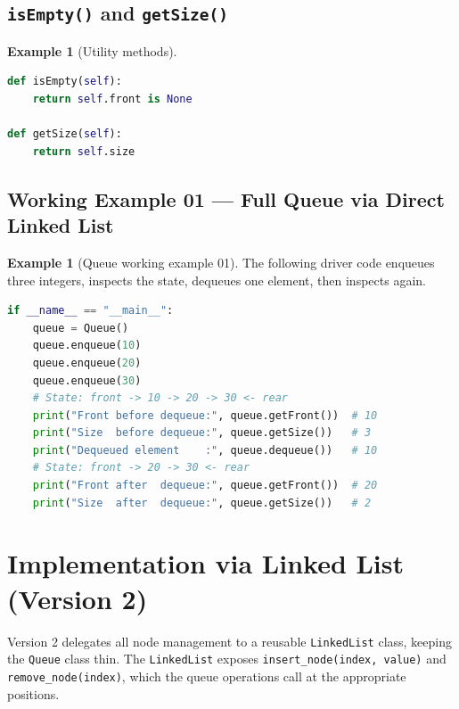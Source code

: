 \documentclass[11pt, a4paper, notitlepage]{report}
\theoremstyle{definition}
\theoremstyle{remark}
\theoremstyle{definition}
\newtheorem{example}[theorem]{Example}
\begin{document}
\subsection{\texttt{isEmpty()} and \texttt{getSize()}}
\label{subsec:queue-utils}

\begin{example}[Utility methods]
\label{ex:queue-utils}
\leavevmode
\begin{lstlisting}[language=Python]
def isEmpty(self):
    return self.front is None

def getSize(self):
    return self.size
\end{lstlisting}
\end{example}

\subsection{Working Example 01 --- Full Queue via Direct Linked List}
\label{subsec:queue-example1}

\begin{example}[Queue working example 01]
\label{ex:queue-working1}
The following driver code enqueues three integers, inspects the state, dequeues one element,
then inspects again.
\begin{lstlisting}[language=Python]
if __name__ == "__main__":
    queue = Queue()
    queue.enqueue(10)
    queue.enqueue(20)
    queue.enqueue(30)
    # State: front -> 10 -> 20 -> 30 <- rear
    print("Front before dequeue:", queue.getFront())  # 10
    print("Size  before dequeue:", queue.getSize())   # 3
    print("Dequeued element    :", queue.dequeue())   # 10
    # State: front -> 20 -> 30 <- rear
    print("Front after  dequeue:", queue.getFront())  # 20
    print("Size  after  dequeue:", queue.getSize())   # 2
\end{lstlisting}
\end{example}


\section{Implementation via Linked List (Version 2)}
\label{sec:queue-impl-v2}

Version 2 delegates all node management to a reusable \texttt{LinkedList} class, keeping the
\texttt{Queue} class thin.  The \texttt{LinkedList} exposes \texttt{insert\_node(index, value)}
and \texttt{remove\_node(index)}, which the queue operations call at the appropriate positions.
\end{document}
